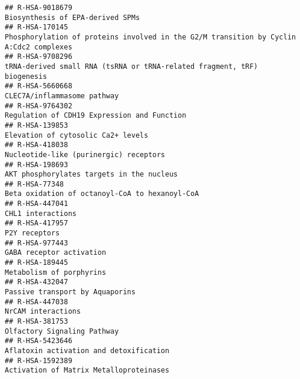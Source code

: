 \documentclass[
]{article}
\begin{document}
\begin{verbatim}
## R-HSA-9018679                                                                                                     Biosynthesis of EPA-derived SPMs
## R-HSA-170145                                                Phosphorylation of proteins involved in the G2/M transition by Cyclin A:Cdc2 complexes
## R-HSA-9708296                                                              tRNA-derived small RNA (tsRNA or tRNA-related fragment, tRF) biogenesis
## R-HSA-5660668                                                                                                          CLEC7A/inflammasome pathway
## R-HSA-9764302                                                                                          Regulation of CDH19 Expression and Function
## R-HSA-139853                                                                                                    Elevation of cytosolic Ca2+ levels
## R-HSA-418038                                                                                                Nucleotide-like (purinergic) receptors
## R-HSA-198693                                                                                             AKT phosphorylates targets in the nucleus
## R-HSA-77348                                                                                         Beta oxidation of octanoyl-CoA to hexanoyl-CoA
## R-HSA-447041                                                                                                                     CHL1 interactions
## R-HSA-417957                                                                                                                         P2Y receptors
## R-HSA-977443                                                                                                              GABA receptor activation
## R-HSA-189445                                                                                                              Metabolism of porphyrins
## R-HSA-432047                                                                                                       Passive transport by Aquaporins
## R-HSA-447038                                                                                                                    NrCAM interactions
## R-HSA-381753                                                                                                           Olfactory Signaling Pathway
## R-HSA-5423646                                                                                              Aflatoxin activation and detoxification
## R-HSA-1592389                                                                                              Activation of Matrix Metalloproteinases

\end{verbatim}
\end{document}
